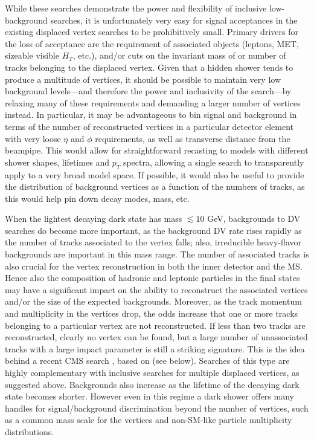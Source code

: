 While these searches demonstrate the power and flexibility of inclusive low-background searches, it is unfortunately very easy for signal acceptances in the existing displaced vertex searches to be prohibitively small.  Primary drivers for the loss of acceptance are the requirement of associated objects (leptons, MET, sizeable visible $H_T$, etc.), and/or cuts on the invariant mass of or number of tracks belonging to the displaced vertex. Given that a hidden shower tends to produce a multitude of vertices, it should be possible to maintain very low background levels---and therefore the power and inclusivity of the search---by relaxing many of these requirements and demanding a larger number of vertices instead.  In particular, it may be advantageous to bin signal and background in terms of the number of reconstructed vertices in a particular detector element with very loose $\eta$ and $\phi$ requirements, as well as transverse distance from the beampipe. This would allow for straightforward recasting to models with different shower shapes, lifetimes and $p_T$ spectra, allowing a single search to transparently apply to a very broad model space. If possible, it would also be useful to provide the distribution of background vertices as a function of the numbers of tracks, as this would help pin down decay modes, mass, etc.

When the lightest decaying dark state has mass $\lesssim 10$ GeV, backgrounds to DV searches do become more important, as the background DV rate rises rapidly as the number of tracks associated to the vertex falls; also, irreducible heavy-flavor backgrounds are important in this mass range. The number of associated tracks is also crucial for the vertex reconstruction in both the inner detector and the MS. Hence also the composition of hadronic and leptonic particles in the final states may have a significant impact on the ability to reconstruct the associated vertices and/or the size of the expected backgrounds. Moreover, as the track momentum and multiplicity in the vertices drop, the odds increase that one or more tracks belonging to a particular vertex are not reconstructed. If less than two tracks are reconstructed, clearly no vertex can be found, but a large number of unassociated tracks with a large impact parameter is still a striking signature. This is the idea behind a recent  CMS search \cite{CMS-PAS-EXO-18-001}, based on \cite{Schwaller:2015gea} (see below). Searches of this type are highly complementary with inclusive searches for multiple displaced vertices, as suggested above.
Backgrounds also increase as the lifetime of the decaying dark state becomes shorter.  However even in this regime a dark shower offers many handles for signal/background discrimination beyond the number of vertices, such as a common mass scale for the vertices and non-SM-like particle multiplicity distributions.

